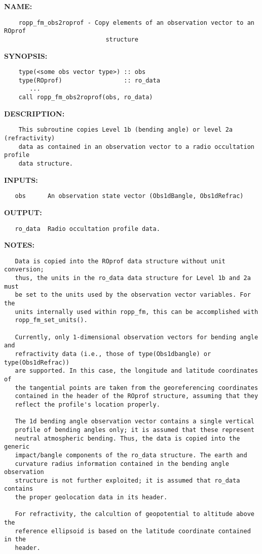 \label{ch:robo28}
\label{ch:Copying_ropp_fm_obs2roprof}
\textbf{NAME:}\hspace{0.08in}\begin{Verbatim}
    ropp_fm_obs2roprof - Copy elements of an observation vector to an ROprof
                            structure
\end{Verbatim}
\textbf{SYNOPSIS:}\hspace{0.08in}\begin{Verbatim}
    type(<some obs vector type>) :: obs
    type(ROprof)                 :: ro_data
       ...
    call ropp_fm_obs2roprof(obs, ro_data)
\end{Verbatim}
\textbf{DESCRIPTION:}\hspace{0.08in}\begin{Verbatim}
    This subroutine copies Level 1b (bending angle) or level 2a (refractivity)
    data as contained in an observation vector to a radio occultation profile
    data structure.
\end{Verbatim}
\textbf{INPUTS:}\hspace{0.08in}\begin{Verbatim}
   obs      An observation state vector (Obs1dBangle, Obs1dRefrac)
\end{Verbatim}
\textbf{OUTPUT:}\hspace{0.08in}\begin{Verbatim}
   ro_data  Radio occultation profile data.
\end{Verbatim}
\textbf{NOTES:}\hspace{0.08in}\begin{Verbatim}
   Data is copied into the ROprof data structure without unit conversion;
   thus, the units in the ro_data data structure for Level 1b and 2a must
   be set to the units used by the observation vector variables. For the
   units internally used within ropp_fm, this can be accomplished with
   ropp_fm_set_units().

   Currently, only 1-dimensional observation vectors for bending angle and
   refractivity data (i.e., those of type(Obs1dbangle) or type(Obs1dRefrac))
   are supported. In this case, the longitude and latitude coordinates of
   the tangential points are taken from the georeferencing coordinates
   contained in the header of the ROprof structure, assuming that they
   reflect the profile's location properly.

   The 1d bending angle observation vector contains a single vertical 
   profile of bending angles only; it is assumed that these represent
   neutral atmospheric bending. Thus, the data is copied into the generic
   impact/bangle components of the ro_data structure. The earth and 
   curvature radius information contained in the bending angle observation
   structure is not further exploited; it is assumed that ro_data contains
   the proper geolocation data in its header.

   For refractivity, the calcultion of geopotential to altitude above the
   reference ellipsoid is based on the latitude coordinate contained in the
   header.
\end{Verbatim}
